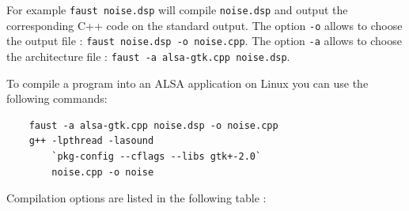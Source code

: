 \documentclass[a4paper,10pt]{book}
\begin{document}
For example \lstinline'faust noise.dsp' will compile \lstinline'noise.dsp' and output the corresponding C++ code on the standard output.  The option \lstinline'-o' allows to choose the output file : \lstinline'faust noise.dsp -o noise.cpp'. The option \lstinline'-a' allows to choose the architecture file : \lstinline'faust -a alsa-gtk.cpp noise.dsp'. 

To compile a \faust program into an ALSA application on Linux you can use the following commands: 
\begin{lstlisting}
	faust -a alsa-gtk.cpp noise.dsp -o noise.cpp
	g++ -lpthread -lasound  
		`pkg-config --cflags --libs gtk+-2.0` 
		noise.cpp -o noise
\end{lstlisting} 


Compilation options are listed in the following table :

\bigskip

\small

\tablelasttail{
  \hline
}
\end{document}
